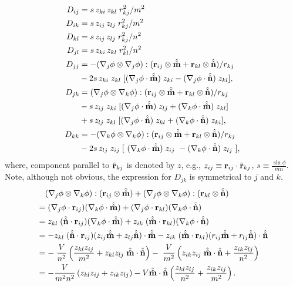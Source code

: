 \documentclass{article}
\begin{document}
\begin{equation}
\begin{split}
D_{ij} &= s \, z_{ki} \, z_{kl} \; r_{kj}^2/m^2   \\
%
D_{ik} &= s \, z_{ij} \, z_{lj} \; r_{kj}^2/m^2 \\
%
D_{kl} &= s \, z_{ij} \, z_{lj} \; r_{kj}^2 / n^2 \\
%
D_{jl} &= s \, z_{ki} \, z_{kl} \; r_{kl}^2/n^2 \\
%
D_{jj} 
&= - (\djphi \otimes \djphi)  : 
    (\vr_{ij} \otimes \vmhh + \vr_{kl} \otimes \vnhh)
  / r_{kj} \\
&  - 2 s \, 
  z_{ki} \; z_{kl} \;
  [
    (\djphi \cdot \vmhh) \; z_{ki}
   -(\djphi \cdot \vnhh) \; z_{kl}
  ], \\
%
D_{jk} 
&= (\djphi \otimes \dkphi)  : 
    (\vr_{ij} \otimes \vmhh + \vr_{kl} \otimes \vnhh)
 / r_{kj}  \\
&  
 - s \,
  z_{ij} \; z_{ki} \;
  [
    (\djphi \cdot \vmhh) \; z_{lj}
   +(\dkphi \cdot \vmhh) \; z_{kl}
  ] \nonumber \\
& 
 +s \,
  z_{lj} \; z_{kl} \;
  [
    (\djphi \cdot \vnhh) \; z_{kl}
   +(\dkphi \cdot \vnhh) \; z_{ki}
  ], \\
%
D_{kk}
&= - 
    (\dkphi \otimes \dkphi)  : 
    (\vr_{ij} \otimes \vmhh + \vr_{kl} \otimes \vnhh)
   /r_{kj} \\
&  - 2 s \,
  z_{lj} \; z_{ij} \;
  [ \
    (\dkphi \cdot \vmhh) \; z_{ij} \
   -(\dkphi \cdot \vnhh) \; z_{lj} \
  ],
\end{split}
\end{equation}
where, component parallel to $\hat{\mathbf{r}}_{kj}$ is denoted by $z$, e.g., 
$z_{ij} \equiv \mathbf{r}_{ij} \cdot \hat{\mathbf{r}}_{kj}$, 
%
$s \equiv \frac {\sin \phi} {mn}$.
Note, although not obvious, the expression for $D_{jk}$ is symmetrical to $j$ and $k$. 
\begin{align*}
&\ \ \ (\nabla_j \phi \otimes \nabla_k \phi) : (\mathbf{r}_{ij} \otimes \hat{\hat{\mathbf{m}}})
+ (\nabla_j \phi \otimes \nabla_k \phi) : (\mathbf{r}_{kl} \otimes \hat{\hat{\mathbf{n}}}) \\
&= (\nabla_j \phi \cdot \mathbf{r}_{ij})
  (\nabla_k \phi \cdot \hat{\hat{\mathbf{m}}})
+ (\nabla_j \phi \cdot \mathbf{r}_{kl})
  (\nabla_k \phi \cdot \hat{\hat{\mathbf{n}}}) \\
&= z_{kl} \; (\hat{\hat{\mathbf{n}}} \cdot \mathbf{r}_{ij})
  (\nabla_k \phi \cdot \hat{\hat{\mathbf{m}}} ) 
+  z_{ik} \; (\hat{\hat{\mathbf{m}}} \cdot \mathbf{r}_{kl})
  (\nabla_k \phi \cdot \hat{\hat{\mathbf{n}}} ) \\
&= -z_{kl} \; (\hat{\hat{\mathbf{n}}} \cdot \mathbf{r}_{ij})
   (z_{ij} \hat{\hat{\mathbf{m}}} + z_{lj} \hat{\hat{\mathbf{n}}}) \cdot \hat{\hat{\mathbf{m}}} 
-  z_{ik} \; (\hat{\hat{\mathbf{m}}} \cdot \mathbf{r}_{kl})
   (r_{ij} \hat{\hat{\mathbf{m}}} + r_{lj} \hat{\hat{\mathbf{n}}}) \cdot \hat{\hat{\mathbf{n}}} \\
&= - \; \frac{V}{n^2}
  \left( 
    \frac {z_{kl} z_{ij}}{m^2} +
    z_{kl} z_{lj} \; \hat{\hat{\mathbf{m}}} \cdot \hat{\hat{\mathbf{n}}} 
  \right)
- \; \frac{V}{m^2}
  \left( 
    z_{ik} z_{ij} \; \hat{\hat{\mathbf{m}}} \cdot \hat{\hat{\mathbf{n}}} +
    \frac {z_{ik} z_{lj}} {n^2} 
  \right) \\  
&= - \frac{V}{m^2 n^2} 
  \left(
    z_{kl} z_{ij} + z_{ik} z_{lj}
  \right)
   - V \hat{\hat{\mathbf{m}}} \cdot \hat{\hat{\mathbf{n}}}
   \left(
     \frac {z_{kl} z_{lj}} {n^2} 
    +\frac {z_{ik} z_{ij}} {m^2} 
   \right).
\end{align*}
%
\end{document}
